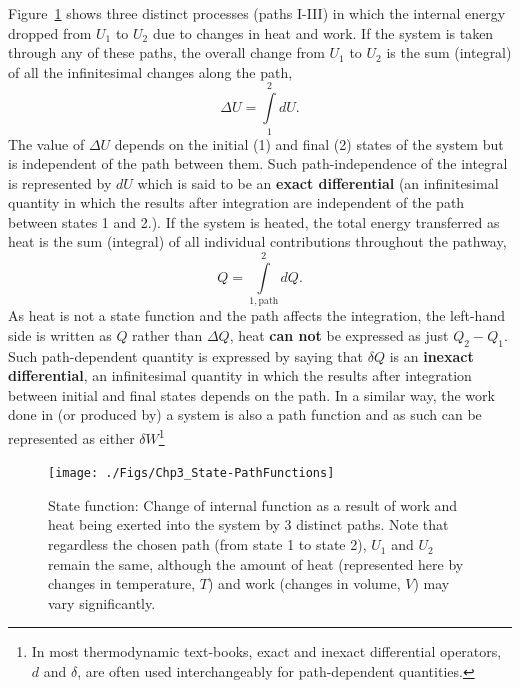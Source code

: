         Figure~\ref{Chapter:FirstLaw:Fig:StateFunctions} shows three distinct processes (paths I-III) in which the internal energy dropped from $U_{1}$ to $U_{2}$ due to changes in heat and work. If the system is taken through any of these paths, the overall change from $U_{1}$ to $U_{2}$ is the sum (\ie integral) of all the infinitesimal changes along the path,
        \begin{displaymath}
             \Delta U = \int\limits_{1}^{2} dU.
        \end{displaymath}
        The value of $\Delta U$ depends on the initial (1) and final (2) states of the system but is independent of the path between them. Such path-independence of the integral is represented by $dU$ which is said to be an {\bf exact differential} (\ie an infinitesimal quantity in which the results after integration are independent of the path between states 1 and 2.). If the system is heated, the total energy transferred as heat is the sum (\ie integral) of all individual contributions throughout the pathway,
        \begin{displaymath}
             Q = \int\limits_{1,\text{path}}^{2}dQ.
        \end{displaymath}
        As heat is not a state function and the path affects the integration, the left-hand side is written as $Q$ rather than $\Delta Q$, \ie heat {\bf can not} be expressed as just $Q_{2}-Q_{1}$. Such path-dependent quantity is expressed by saying that $\delta Q$ is an {\bf inexact differential}, \ie an infinitesimal quantity in which the results after integration between initial and final states depends on the path.  In a similar way, the work done in  (or produced by) a system is also a path function and as such can be represented as either $\delta W$\footnote{In most thermodynamic text-books, exact and inexact differential operators, $d$ and $\delta$, are often used interchangeably for path-dependent quantities.}


   \begin{figure}[h]
     \begin{center}
       \texttt{[image: ./Figs/Chp3\_State-PathFunctions]}
        \caption{State function: Change of internal function as a result of work and heat being exerted into the system by 3 distinct paths. Note that regardless the chosen path (from state 1 to state 2), $U_{1}$ and $U_{2}$ remain the same, although the amount of heat (represented here by changes in temperature, $T$) and work (\ie changes in volume, $V$) may vary significantly.}\label{Chapter:FirstLaw:Fig:StateFunctions}
     \end{center}
   \end{figure}
